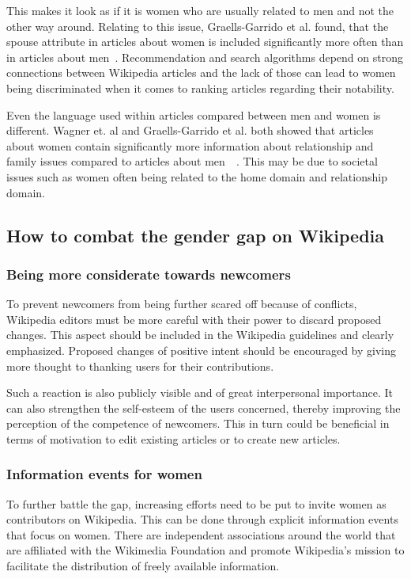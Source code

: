 \documentclass[a4paper, 11pt]{article}
\begin{document}
This makes it look as if it is women who are usually related to men and not the other way around. Relating to this issue, Graells-Garrido et al. found, that the spouse attribute in articles about women is included significantly more often than in articles about men~\cite{graells2015first}. Recommendation and search algorithms depend on strong connections between Wikipedia articles and the lack of those can lead to women being discriminated when it comes to ranking articles regarding their notability.

Even the language used within articles compared between men and women is different. Wagner et. al and Graells-Garrido et al. both showed that articles about women contain significantly more information about relationship and family issues compared to articles about men~\cite{wagner2015s}~\cite{graells2015first}. This may be due to societal issues such as women often being related to the home domain and relationship domain.

\subsection{How to combat the gender gap on Wikipedia} \label{sec:gender-gap-wikipedia:combatgap}
\subsubsection{Being more considerate towards newcomers} \label{sec:gender-gap-wikipedia:newcomers}
To prevent newcomers from being further scared off because of conflicts, Wikipedia editors must be more careful with their power to discard proposed changes. This aspect should be included in the Wikipedia guidelines and clearly emphasized. Proposed changes of positive intent should be encouraged by giving more thought to thanking users for their contributions.

Such a reaction is also publicly visible and of great interpersonal importance. It can also strengthen the self-esteem of the users concerned, thereby improving the perception of the competence of newcomers. This in turn could be beneficial in terms of motivation to edit existing articles or to create new articles.

\subsubsection{Information events for women} \label{sec:gender-gap-wikipedia:infoevents}
To further battle the gap, increasing efforts need to be put to invite women as contributors on Wikipedia. This can be done through explicit information events that focus on women. There are independent associations around the world that are affiliated with the Wikimedia Foundation and promote Wikipedia's mission to facilitate the distribution of freely available information.
\end{document}
